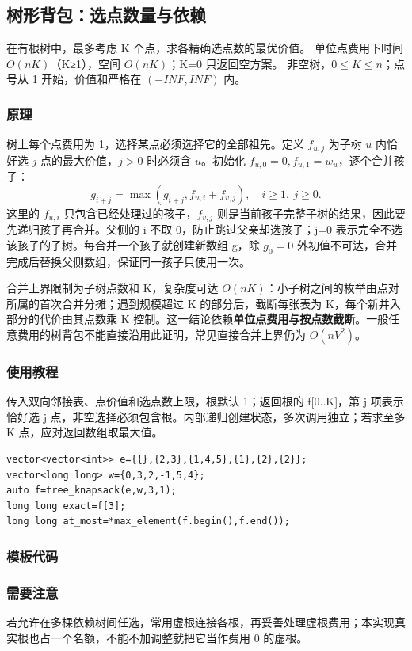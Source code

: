 \subsection{树形背包：选点数量与依赖}
\label{dp:tree-knapsack}
\AlgorithmInfo
    {在有根树中，最多考虑 K 个点，求各精确选点数的最优价值。}
    {单位点费用下时间 $O(nK)$（K≥1），空间 $O(nK)$；K=0 只返回空方案。}
    {非空树，$0\le K\le n$；点号从 1 开始，价值和严格在 $(-INF,INF)$ 内。}
\subsubsection*{原理}

树上每个点费用为 1，选择某点必须选择它的全部祖先。定义 $f_{u,j}$ 为子树 $u$ 内恰好选 $j$ 点的最大价值，$j>0$ 时必须含 $u$。初始化 $f_{u,0}=0,f_{u,1}=w_u$，逐个合并孩子：
\[
 g_{i+j}=\max(g_{i+j},f_{u,i}+f_{v,j}),\quad i\ge1,\ j\ge0.
\]
这里的 $f_{u,i}$ 只包含已经处理过的孩子，$f_{v,j}$ 则是当前孩子完整子树的结果，因此要先递归孩子再合并。父侧的 i 不取 0，防止跳过父亲却选孩子；j=0 表示完全不选该孩子的子树。每合并一个孩子就创建新数组 g，除 $g_0=0$ 外初值不可达，合并完成后替换父侧数组，保证同一孩子只使用一次。

合并上界限制为子树点数和 K，复杂度可达 $O(nK)$：小子树之间的枚举由点对所属的首次合并分摊；遇到规模超过 K 的部分后，截断每张表为 K，每个新并入部分的代价由其点数乘 K 控制。这一结论依赖\textbf{单位点费用与按点数截断}。一般任意费用的树背包不能直接沿用此证明，常见直接合并上界仍为 $O(nV^2)$。

\subsubsection*{使用教程}
 传入双向邻接表、点价值和选点数上限，根默认 1；返回根的 f[0..K]，第 j 项表示恰好选 j 点，非空选择必须包含根。内部递归创建状态，多次调用独立；若求至多 K 点，应对返回数组取最大值。
\begin{lstlisting}[style=mtycpp,numbers=none]
vector<vector<int>> e={{},{2,3},{1,4,5},{1},{2},{2}};
vector<long long> w={0,3,2,-1,5,4};
auto f=tree_knapsack(e,w,3,1);
long long exact=f[3];
long long at_most=*max_element(f.begin(),f.end());
\end{lstlisting}
\subsubsection*{模板代码}
\subsubsection*{需要注意}
若允许在多棵依赖树间任选，常用虚根连接各根，再妥善处理虚根费用；本实现真实根也占一个名额，不能不加调整就把它当作费用 0 的虚根。
